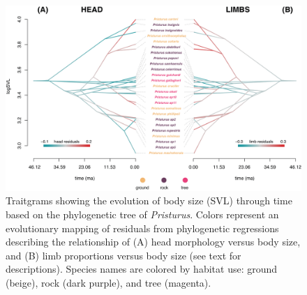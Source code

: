 \documentclass[
  11pt,
]{article}
\begin{document}
\newpage

\begin{figure}

{\centering \includegraphics[width=1\linewidth]{Figs/figure_3_phenogram_RESIDUALS} 

}

\caption{Traitgrams showing the evolution of body size (SVL) through time based on the phylogenetic tree of \textit{Pristurus}. Colors represent an evolutionary mapping of residuals from phylogenetic regressions describing the relationship of (A) head morphology versus body size, and (B) limb proportions versus body size (see text for descriptions). Species names are colored by habitat use: ground (beige), rock (dark purple), and tree (magenta).}\label{fig:unnamed-chunk-6}
\end{figure}

\newpage
\end{document}
